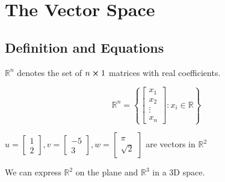 \chapter{The Vector Space}

\section{Definition and Equations}

\begin{definition}
	$\mathbb{R}^n$ denotes the set of $n\cross 1$ matrices with real coefficients.
\end{definition}

\begin{equation} \label{eq:rn}
	\mathbb{R}^n = \left\{\begin{bmatrix}
		x_1\\
		x_2\\
		\vdots\\
		x_n
	\end{bmatrix}:x_i \in \mathbb{R}\right\}
\end{equation}

\begin{example}
	$u = \begin{bmatrix}
		1\\
		2
	\end{bmatrix}, v = \begin{bmatrix}
		-5\\
		3
	\end{bmatrix}, w = \begin{bmatrix}
		\pi\\
		\sqrt{2}
	\end{bmatrix}$ are vectors in $\mathbb{R}^2$

	We can express $\mathbb{R}^2$ on the plane and $\mathbb{R}^3$ in a 3D space.
\end{example}

